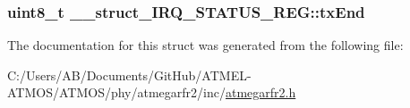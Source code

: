 \hypertarget{struct____struct___i_r_q___s_t_a_t_u_s___r_e_g_ae0651cfa44aef5edc1e6d2400daa40ed}{
\subsubsection[{tx\-End}]{\setlength{\rightskip}{0pt plus 5cm}uint8\-\_\-t \-\_\-\-\_\-struct\-\_\-\-I\-R\-Q\-\_\-\-S\-T\-A\-T\-U\-S\-\_\-\-R\-E\-G\-::tx\-End}}\label{struct____struct___i_r_q___s_t_a_t_u_s___r_e_g_ae0651cfa44aef5edc1e6d2400daa40ed}


The documentation for this struct was generated from the following file\-:\begin{DoxyCompactItemize}
\item 
C\-:/\-Users/\-A\-B/\-Documents/\-Git\-Hub/\-A\-T\-M\-E\-L-\/\-A\-T\-M\-O\-S/\-A\-T\-M\-O\-S/phy/atmegarfr2/inc/\hyperlink{atmegarfr2_8h}{atmegarfr2.\-h}\end{DoxyCompactItemize}
